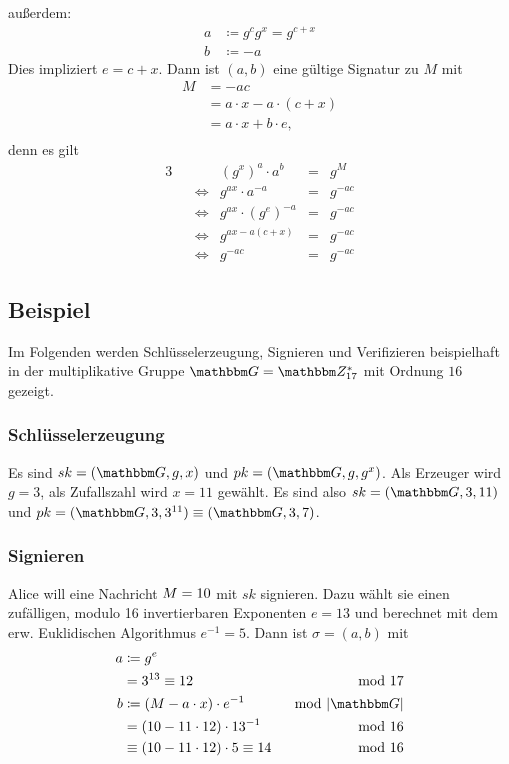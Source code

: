\begin{description}
  außerdem:
  \begin{align*} a &\coloneqq g^cg^x = g^{c+x}\\ b &\coloneqq -a
  \end{align*} Dies impliziert $e=c+x$.  Dann ist $(a, b)$ eine
  gültige Signatur zu $M$ mit
  \begin{align*} M &= -ac\\ &= a \cdot x - a \cdot (c + x)\\ &= a
                                                               \cdot x + b \cdot e,\\
  \end{align*} denn es gilt
  \begin{alignat*}{3} && & (g^x)^a\cdot a^b &= &g^M\\ &&
    \Leftrightarrow & g^{ax} \cdot a^{-a} &= &g^{-ac}\\ && \Leftrightarrow &
    g^{ax} \cdot (g^e)^{-a} &= &g^{-ac}\\ && \Leftrightarrow & g^{ax-a(c+x)}
    &= &g^{-ac}\\ && \Leftrightarrow & g^{-ac} &= &g^{-ac}
  \end{alignat*}
\end{description}
\subsection{Beispiel} Im Folgenden werden Schlüsselerzeugung,
Signieren und Verifizieren beispielhaft in der multiplikative Gruppe $\G
= \Z{17}^{*}$ mit Ordnung $16$ gezeigt.
\subsubsection*{Schlüsselerzeugung} Es sind $\skey = (\G, g, x)$
und $\pkey = (\G, g, g^x)$. Als Erzeuger wird $g=3$, als Zufallszahl
wird $x=11$ gewählt. Es sind also $\skey = (\G, 3, 11)$ und $\pkey =
(\G, 3, 3^{11})\equiv (\G, 3, 7)$.
\subsubsection*{Signieren} Alice will eine Nachricht $M =
10$ mit $sk$ signieren. Dazu wählt sie einen zufälligen, modulo 16
invertierbaren Exponenten $e= 13$ und berechnet mit dem
erw. Euklidischen Algorithmus $e^{-1}=5$. Dann ist $\sigma = (a, b)$ mit
\begin{align*} 
  a &\coloneqq g^e &\\ 
    &= 3^{13} \equiv 12 & \mod 17\\ 
  b &\coloneqq (\plaint-a \cdot x) \cdot e^{-1} & \mod |\G|\\
    &= (10 - 11 \cdot 12) \cdot 13^{-1} & \mod 16\\
    &\equiv (10 - 11\cdot 12) \cdot 5 \equiv 14 & \mod 16
\end{align*}
